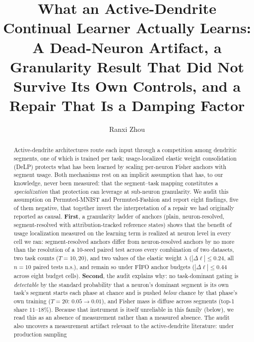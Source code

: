 \documentclass[review,12pt,number]{elsarticle}
\newcommand{\delp}{DeLP}
\begin{document}
\linenumbers

\begin{frontmatter}

\title{What an Active-Dendrite Continual Learner Actually Learns:
A Dead-Neuron Artifact, a Granularity Result That Did Not Survive Its
Own Controls, and a Repair That Is a Damping Factor}

\author[hnucm]{Ranxi Zhou}
\address[hnucm]{Hunan University of Chinese Medicine, 300 Xueshi Avenue,
Hanpu, Yuelu District, Changsha 410208, Hunan, China}

\begin{abstract}
Active-dendrite architectures route each input through a competition among
dendritic segments, one of which is trained per task; usage-localized elastic
weight consolidation (\delp{}) protects what has been learned by scaling
per-neuron Fisher anchors with segment usage. Both mechanisms rest on an
implicit assumption that has, to our knowledge, never been measured: that the
segment--task mapping constitutes a \emph{specialization} that protection can
leverage at sub-neuron granularity. We audit this assumption on
Permuted-MNIST and Permuted-Fashion and report eight findings, five of them
negative, that together invert the interpretation of a repair we had
originally reported as causal. \textbf{First}, a granularity ladder of anchors
(plain, neuron-resolved, segment-resolved with attribution-tracked reference
states) shows that the benefit of usage localization measured on the learning term is
realized at neuron level in every cell we ran: segment-resolved anchors differ from
neuron-resolved anchors by no more than the resolution of a 10-seed paired test
across every combination of two datasets, two task
counts ($T{=}10,20$), and two values of the elastic weight
$\lambda$ ($|\Delta\ell|\le 0.24$, all
$n{=}10$ paired tests n.s.), and remain so under FIFO anchor budgets
($|\Delta\ell|\le 0.44$ across eight budget cells). \textbf{Second}, the audit
explains why: no task-dominant gating is \emph{detectable} by the standard
probability that a neuron's dominant segment is its own task's segment starts
each phase at chance and is pushed \emph{below} chance by that phase's own
training ($T{=}20$: $0.05 \to 0.01$), and Fisher mass is diffuse across
segments (top-1 share $11$--$18\%$). Because that instrument is itself unreliable
in this family (below), we read this as an absence of measurement rather than a
measured absence. The audit also uncovers a measurement
artifact relevant to the active-dendrite literature: under production sampling

\end{abstract}
\end{frontmatter}
\end{document}
